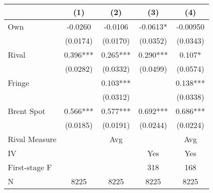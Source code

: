 {
\def\sym#1{\ifmmode^{#1}\else\(^{#1}\)\fi}
\begin{tabular}{l*{4}{c}}
\toprule
                &\multicolumn{1}{c}{(1)}   &\multicolumn{1}{c}{(2)}   &\multicolumn{1}{c}{(3)}   &\multicolumn{1}{c}{(4)}   \\
\midrule
Own             &  -0.0260   &  -0.0106   &  -0.0613*  & -0.00950   \\
                & (0.0174)   & (0.0170)   & (0.0352)   & (0.0343)   \\
\addlinespace
Rival           &    0.396***&    0.265***&    0.290***&    0.107*  \\
                & (0.0282)   & (0.0332)   & (0.0499)   & (0.0574)   \\
\addlinespace
Fringe          &            &    0.103***&            &    0.138***\\
                &            & (0.0312)   &            & (0.0338)   \\
\addlinespace
Brent Spot      &    0.566***&    0.577***&    0.692***&    0.686***\\
                & (0.0185)   & (0.0191)   & (0.0244)   & (0.0224)   \\
\midrule
Rival Measure   &            &      Avg   &            &      Avg   \\
IV              &            &            &      Yes   &      Yes   \\
First-stage F   &            &            &      318   &      168   \\
N               &     8225   &     8225   &     8225   &     8225   \\
\bottomrule
\end{tabular}
}
